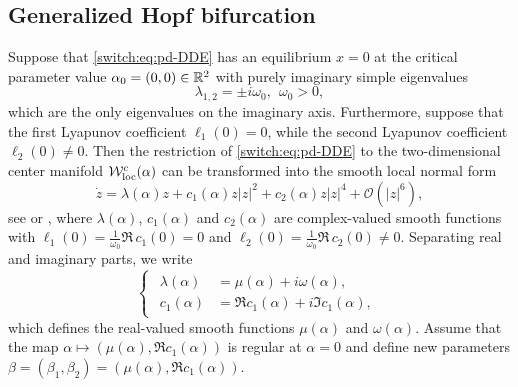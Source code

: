 \subsection{Generalized Hopf bifurcation}\label{switch:sec:GH_coef}
Suppose that \cref{switch:eq:pd-DDE} has an equilibrium $x=0$ at the critical parameter value $\alpha_{0}=(0,0)\in \mathbb{R}^{2}$ with purely imaginary simple eigenvalues
\begin{equation}
\lambda_{1,2}=\pm i\omega_{0},\ \ \omega_{0}>0,\label{switch:eq:GH_eigenvalues}
\end{equation}
which are the only eigenvalues on the imaginary axis. Furthermore, suppose that the first Lyapunov coefficient $\ell_{1}(0)=0$, while the second Lyapunov coefficient $\ell_{2}(0)\neq0$. Then the restriction of \cref{switch:eq:pd-DDE} to the two-dimensional center manifold $\mathcal{W}^c_{\text{loc}}(\alpha)$ can be transformed into the smooth local normal form
\begin{equation}
\label{switch:eq:GH_nf_alpha}
\dot{z}=\lambda(\alpha)z+c_{1}(\alpha)z|z|^{2}+c_{2}(\alpha)z|z|^{4}+\mathcal{O}(|z|^{6}),
\end{equation}
see \cite[\S 33]{Arnold_1983} or \cite[\S 8.3, Lemma 8.3]{Kuznetsov2004}, where $\lambda(\alpha)$, $c_{1}(\alpha)$ and $c_{2}(\alpha)$ are complex-valued smooth functions with $\ell_{1}(0)=\frac{1}{\omega_0}\Re\,c_{1}(0)=0$ and $\ell_{2}(0)=\frac{1}{\omega_0}\Re\,c_{2}(0)\neq0$. Separating real and imaginary parts, we write
\[
\begin{cases}
\begin{aligned}
\lambda(\alpha) & =\mu(\alpha)+i\omega(\alpha),\\
c_{1}(\alpha) & =\Re c_{1}(\alpha)+i\Im c_{1}(\alpha),
\end{aligned}
\end{cases}
\]
which defines the real-valued smooth functions $\mu(\alpha)$ and $\omega(\alpha)$. Assume that the map $\alpha\mapsto(\mu(\alpha),\Re c_{1}(\alpha))$ is regular at $\alpha=0$ and define new parameters $\beta=(\beta_{1},\beta_2)=(\mu(\alpha),\Re c_{1}(\alpha))$.

